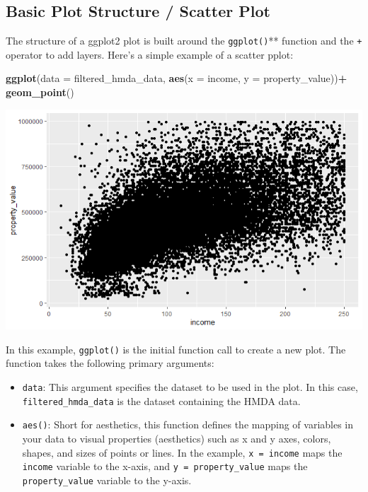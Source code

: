 \documentclass[
]{book}
\newenvironment{Shaded}{\begin{snugshade}}{\end{snugshade}}
\newcommand{\AttributeTok}[1]{\textcolor[rgb]{0.13,0.29,0.53}{#1}}
\newcommand{\FunctionTok}[1]{\textcolor[rgb]{0.13,0.29,0.53}{\textbf{#1}}}
\newcommand{\NormalTok}[1]{#1}
\newcommand{\SpecialCharTok}[1]{\textcolor[rgb]{0.81,0.36,0.00}{\textbf{#1}}}
\providecommand{\tightlist}{%
  \setlength{\itemsep}{0pt}\setlength{\parskip}{0pt}}
\begin{document}
\hypertarget{basic-plot-structure-scatter-plot}{%
\subsection*{Basic Plot Structure / Scatter Plot}\label{basic-plot-structure-scatter-plot}}

The structure of a ggplot2 plot is built around the \texttt{ggplot()}** function and the \texttt{+} operator to add layers. Here's a simple example of a scatter pplot:

\begin{Shaded}
\begin{Highlighting}[]
\FunctionTok{ggplot}\NormalTok{(}\AttributeTok{data =}\NormalTok{ filtered\_hmda\_data, }\FunctionTok{aes}\NormalTok{(}\AttributeTok{x =}\NormalTok{ income, }\AttributeTok{y =}\NormalTok{ property\_value))}\SpecialCharTok{+}
  \FunctionTok{geom\_point}\NormalTok{()}
\end{Highlighting}
\end{Shaded}

\includegraphics{images/basic_plot_structure_img_1.PNG}

In this example, \texttt{ggplot()} is the initial function call to create a new plot. The function takes the following primary arguments:

\begin{itemize}
\tightlist
\item
  \texttt{data}: This argument specifies the dataset to be used in the plot. In this case, \texttt{filtered\_hmda\_data} is the dataset containing the HMDA data.
\item
  \texttt{aes()}: Short for aesthetics, this function defines the mapping of variables in your data to visual properties (aesthetics) such as x and y axes, colors, shapes, and sizes of points or lines. In the example, \texttt{x\ =\ income} maps the \texttt{income} variable to the x-axis, and \texttt{y\ =\ property\_value} maps the \texttt{property\_value} variable to the y-axis.
\end{itemize}
\end{document}
